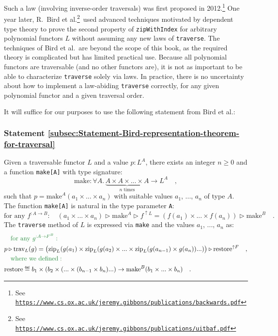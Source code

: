 Such a law (involving inverse-order traversals) was first proposed
in 2012.\footnote{See \texttt{\href{https://www.cs.ox.ac.uk/jeremy.gibbons/publications/backwards.pdf}{https://www.cs.ox.ac.uk/jeremy.gibbons/publications/backwards.pdf}}}
One year later, R.~Bird et al.\footnote{\label{fn:uitbaf}See \texttt{\href{https://www.cs.ox.ac.uk/jeremy.gibbons/publications/uitbaf.pdf}{https://www.cs.ox.ac.uk/jeremy.gibbons/publications/uitbaf.pdf}}}~used
advanced techniques motivated by dependent type theory to prove the
second property of \lstinline!zipWithIndex! for arbitrary polynomial
functors $L$ without assuming any new laws of \lstinline!traverse!.
The techniques of Bird et al.~are beyond the scope of this book,
as the required theory is complicated but has limited practical use.
Because all polynomial functors are traversable (and no other functors
are), it is not as important to be able to characterize \lstinline!traverse!
solely via laws. In practice, there is no uncertainty about how to
implement a law-abiding \lstinline!traverse! correctly, for any given
polynomial functor and a given traversal order. 

It will suffice for our purposes to use the following statement from
Bird et al.:

\subsubsection{Statement \label{subsec:Statement-Bird-representation-theorem-for-traversal}\ref{subsec:Statement-Bird-representation-theorem-for-traversal}}

Given a traversable functor $L$ and a value $p:L^{A}$, there exists
an integer $n\ge0$ and a function \lstinline!make[A]! with type
signature:
\[
\text{make}:\forall A.\,\underbrace{A\times A\times...\times A}_{n\text{ times}}\rightarrow L^{A}\quad,
\]
such that $p=\text{make}^{A}(a_{1}\times...\times a_{n})$ with suitable
values $a_{1}$, ..., $a_{n}$ of type $A$. The function \lstinline!make[A]!
is natural in the type parameter \lstinline!A!:
\[
\text{for any }f^{:A\rightarrow B}:\quad(a_{1}\times...\times a_{n})\triangleright\text{make}^{A}\triangleright f^{\uparrow L}=(f(a_{1})\times...\times f(a_{n}))\triangleright\text{make}^{B}\quad.
\]
The \lstinline!traverse! method of $L$ is expressed via \lstinline!make!
and the values $a_{1}$, ..., $a_{n}$ as: 
\begin{align*}
 & \quad{\color{greenunder}\text{for any }g^{:A\rightarrow F^{B}}:}\quad\\
 & p\triangleright\text{trav}_{L}(g)=\big(\text{zip}_{L}(g(a_{1})\times\text{zip}_{L}(g(a_{2})\times...\times\text{zip}_{L}(g(a_{n-1})\times g(a_{n}))...)\big)\triangleright\text{restore}^{\uparrow F}\quad,\\
 & \quad{\color{greenunder}\text{where we defined}:}\quad\\
 & \text{restore}\triangleq b_{1}\times(b_{2}\times(...\times(b_{n-1}\times b_{n})...)\rightarrow\text{make}^{B}(b_{1}\times...\times b_{n})\quad.
\end{align*}



